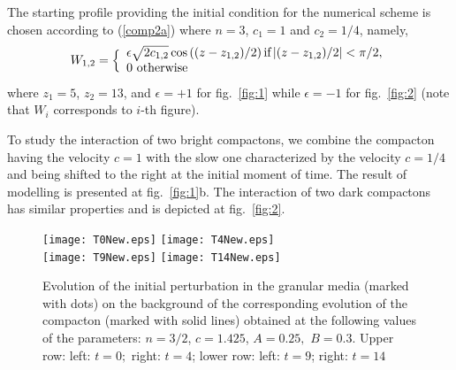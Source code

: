 \documentclass[12pt]{article}
\begin{document}
The starting profile providing the initial condition for the numerical
scheme is chosen according to (\ref{comp2a}) where $n=3$, $c_1=1$ and $c_2=1/4$, namely,
\begin{equation*}
W_{1,2}=\Bigl\{
\begin{array}{l}
\epsilon\sqrt{2c_{1,2}}\cos\left((z-z_{1,2})/2\right) \mbox{if} \left|(z-z_{1,2})/2\right|<\pi/2,\\
0\ \mbox{otherwise}
\end{array}
\end{equation*}
where $z_1=5$, $z_2=13$, and $\epsilon=+1$ for fig.~\ref{fig:1} while $\epsilon=-1$ for fig.~\ref{fig:2}
(note that $W_i$ corresponds to $i$-th figure).




To study the interaction of two bright compactons,
we combine the compacton having the velocity $c=1$ with the slow one characterized by the velocity $c=1/4$ and being shifted to the right at the initial moment of time.
 The result of modelling
is presented at fig.~\ref{fig:1}b. The interaction of two dark compactons has similar properties and is depicted at fig.~\ref{fig:2}.






\begin{figure}
\begin{center}
\texttt{[image: T0New.eps]}
\texttt{[image: T4New.eps]}
\\
\texttt{[image: T9New.eps]}
\texttt{[image: T14New.eps]}
\caption{Evolution of the initial perturbation in the granular media (marked with dots) on the
 background of the corresponding evolution of the  compacton (marked with solid lines) obtained at the following values of the parameters: $n=3/2$, $c=1.425$, $A=0.25,$ $B=0.3.$  Upper row: left: $t=0;$ right: $t=4$; lower row: left: $t=9$; right: $t=14$
}\label{Fig:singcomp} \end{center}
\end{figure}






\end{document}
